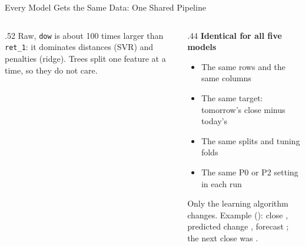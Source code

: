 \documentclass[aspectratio=169,11pt]{beamer}
\begin{document}
\begin{frame}{Every Model Gets the Same Data: One Shared Pipeline}
\begin{columns}[T,onlytextwidth]
\begin{column}{.52\textwidth}
      Raw, \texttt{dow} is about 100 times larger than \texttt{ret\_1}: it dominates distances (SVR) and
      penalties (ridge). Trees split one feature at a time, so they do not care.
    \end{column}
    \begin{column}{.44\textwidth}
      \small\textbf{Identical for all five models}
      \begin{itemize}\scriptsize\setlength{\itemsep}{0pt}
        \item The same rows and the same \NFeatures{} columns
        \item The same target: tomorrow's close minus today's
        \item The same splits and tuning folds
        \item The same P0 or P2 setting in each run
      \end{itemize}
      \vspace{1mm}
      \scriptsize Only the learning algorithm changes. Example (\ExDate): close \ExCt, predicted change
      \ExDelta, forecast \ExPred; the next close was \ExActual.
    \end{column}
  \end{columns}
\end{frame}
\end{document}
